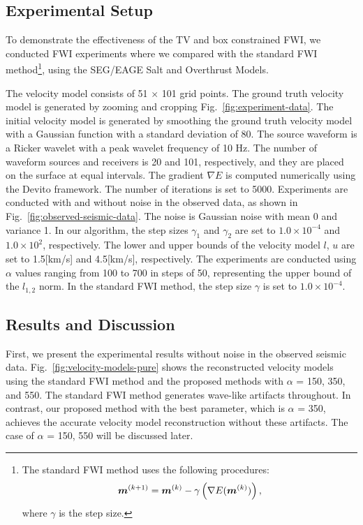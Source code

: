 \subsection{Experimental Setup} \label{subsec:experimental-setup}

To demonstrate the effectiveness of the TV and box constrained FWI, we conducted FWI experiments where we compared with the standard FWI method\footnote{
    \parbox{\linewidth}{The standard FWI method uses the following procedures:
        \begin{equation} \label{eq:FWIWithGradient} \FWIWithGradient, \end{equation}
        where $\gamma$ is the step size.}
}\cite{FWI0}, using the SEG/EAGE Salt and Overthrust Models.

The velocity model consists of 51 $\times$ 101 grid points.
The ground truth velocity model is generated by zooming and cropping Fig.~\ref{fig:experiment-data}.
The initial velocity model is generated by smoothing the ground truth velocity model with a Gaussian function with a standard deviation of 80.
The source waveform is a Ricker wavelet with a peak wavelet frequency of 10 Hz.
The number of waveform sources and receivers is 20 and 101, respectively, and they are placed on the surface at equal intervals.
The gradient $\nabla E$ is computed numerically using the Devito framework\cite{devito}.
The number of iterations is set to 5000.
Experiments are conducted with and without noise in the observed data, as shown in Fig.~\ref{fig:observed-seismic-data}.
The noise is Gaussian noise with mean 0 and variance 1.
In our algorithm, the step sizes $\gamma_1$ and $\gamma_2$ are set to $1.0 \times 10^{-4}$ and $1.0 \times 10^2$, respectively.
The lower and upper bounds of the velocity model $l$, $u$ are set to 1.5[km/s] and 4.5[km/s], respectively.
The experiments are conducted using $\alpha$ values ranging from 100 to 700 in steps of 50, representing the upper bound of the $l_{1,2}$ norm.
In the standard FWI method, the step size $\gamma$ is set to $1.0 \times 10^{-4}$.











\subsection{Results and Discussion} \label{subsec:results-and-discussion}
First, we present the experimental results without noise in the observed seismic data.
Fig.~\ref{fig:velocity-models-pure} shows the reconstructed velocity models using the standard FWI method and the proposed methods with $\alpha$ = 150, 350, and 550.
The standard FWI method generates wave-like artifacts throughout.
In contrast, our proposed method with the best parameter, which is $\alpha$ = 350, achieves the accurate velocity model reconstruction without these artifacts.
The case of $\alpha$ = 150, 550 will be discussed later.

